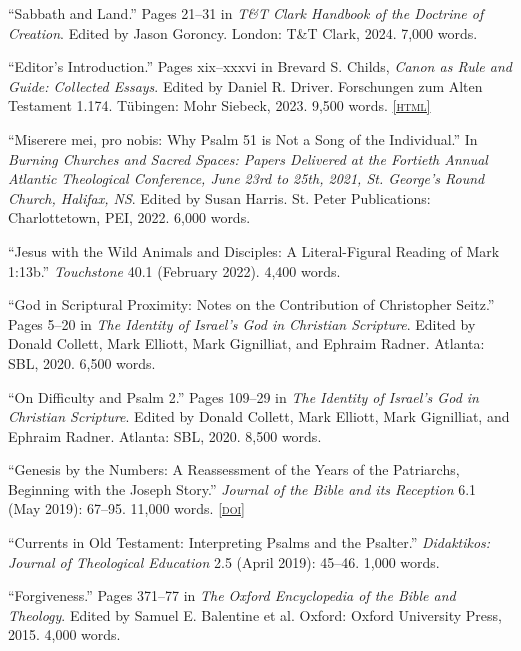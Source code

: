 \documentclass[11pt]{article}
\newcommand{\html}[1]{\href{#1}{\footnotesize\textsc{[html]}}}
\newcommand{\doi}[1]{\href{https://doi.org/#1}{\footnotesize\textsc{[doi]}}}
\newcommand{\years}[1]{\marginnote{\footnotesize #1}}
\begin{document}
\years{2024}
``Sabbath and Land.'' Pages 21--31 in \emph{T\&T Clark Handbook of the
Doctrine of Creation}. Edited by Jason Goroncy. London: T\&T Clark, 2024. 7,000 words.

\years{2023}
``Editor's Introduction.'' Pages xix--xxxvi in Brevard S. Childs, \emph{Canon as Rule and Guide: Collected Essays}. Edited by Daniel R. Driver. Forschungen zum Alten Testament 1.174. Tübingen: Mohr Siebeck, 2023. 9,500 words.
\html{http://danieldriver.com/bsc/}

\years{2022}
``Miserere mei, pro nobis: Why Psalm 51 is Not a Song of the Individual.'' In \emph{Burning Churches and Sacred Spaces: Papers Delivered at the Fortieth Annual Atlantic Theological Conference, June 23rd to 25th, 2021, St. George's Round Church, Halifax, NS}. Edited by Susan Harris. St. Peter Publications: Charlottetown, PEI, 2022. 6,000 words.

\years{2022}
``Jesus with the Wild Animals and Disciples: A Literal-Figural Reading of Mark 1:13b.'' \emph{Touchstone} 40.1 (February 2022). 4,400 words.

\years{2020}%
 ``God in Scriptural Proximity: Notes on the Contribution of Christopher
Seitz.'' Pages 5--20 in \emph{The Identity of Israel’s God in Christian
Scripture}. Edited by Donald Collett, Mark Elliott, Mark Gignilliat, and
Ephraim Radner. Atlanta: SBL, 2020. 6,500 words.%

\years{2020}
``On Difficulty and Psalm 2.'' Pages 109--29 in \emph{The Identity of
Israel’s God in Christian Scripture}. Edited by Donald Collett, Mark
Elliott, Mark Gignilliat, and Ephraim Radner. Atlanta: SBL, 2020. 8,500 words.%

\years{2019}
``Genesis by the Numbers: A Reassessment of the Years of the Patriarchs,
Beginning with the Joseph Story.'' \emph{Journal of the Bible and its
Reception} 6.1 (May 2019): 67–95. 11,000 words.
\doi{10.1515/jbr-2019-1003}

\years{2019}
``Currents in Old Testament: Interpreting Psalms and the Psalter.''
\emph{Didaktikos: Journal of Theological Education} 2.5 (April 2019):
45–46. 1,000 words.%

\years{2015}
``Forgiveness.'' Pages 371--77 in \emph{The Oxford Encyclopedia of the
Bible and Theology}. Edited by Samuel E. Balentine et al. Oxford: Oxford
University Press, 2015. 4,000 words.
\end{document}
